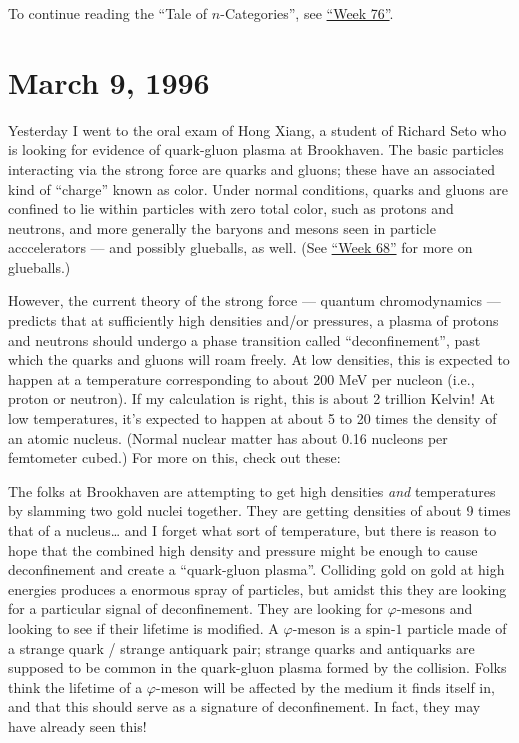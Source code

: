 \documentclass{article}
\renewcommand{\texttt}[1]{%
  \begingroup
  \ttfamily
  \begingroup\lccode`~=`/\lowercase{\endgroup\def~}{/\discretionary{}{}{}}%
  \begingroup\lccode`~=`[\lowercase{\endgroup\def~}{[\discretionary{}{}{}}%
  \begingroup\lccode`~=`.\lowercase{\endgroup\def~}{.\discretionary{}{}{}}%
  \catcode`/=\active\catcode`[=\active\catcode`.=\active
  \scantokens{#1\noexpand}%
  \endgroup
}
\begin{document}
To continue reading the ``Tale of \(n\)-Categories'', see
\protect\hyperlink{week76}{``Week 76''}.



\hypertarget{week76}{%
\section{March 9, 1996}\label{week76}}

Yesterday I went to the oral exam of Hong Xiang, a student of Richard
Seto who is looking for evidence of quark-gluon plasma at Brookhaven.
The basic particles interacting via the strong force are quarks and
gluons; these have an associated kind of ``charge'' known as color.
Under normal conditions, quarks and gluons are confined to lie within
particles with zero total color, such as protons and neutrons, and more
generally the baryons and mesons seen in particle acccelerators --- and
possibly glueballs, as well. (See \protect\hyperlink{week68}{``Week
68''} for more on glueballs.)

However, the current theory of the strong force --- quantum
chromodynamics --- predicts that at sufficiently high densities and/or
pressures, a plasma of protons and neutrons should undergo a phase
transition called ``deconfinement'', past which the quarks and gluons
will roam freely. At low densities, this is expected to happen at a
temperature corresponding to about 200 MeV per nucleon (i.e., proton or
neutron). If my calculation is right, this is about 2 trillion Kelvin!
At low temperatures, it's expected to happen at about 5 to 20 times the
density of an atomic nucleus. (Normal nuclear matter has about 0.16
nucleons per femtometer cubed.) For more on this, check out these:


The folks at Brookhaven are attempting to get high densities \emph{and}
temperatures by slamming two gold nuclei together. They are getting
densities of about 9 times that of a nucleus\ldots{} and I forget what
sort of temperature, but there is reason to hope that the combined high
density and pressure might be enough to cause deconfinement and create a
``quark-gluon plasma''. Colliding gold on gold at high energies produces
a enormous spray of particles, but amidst this they are looking for a
particular signal of deconfinement. They are looking for
\(\varphi\)-mesons and looking to see if their lifetime is modified. A
\(\varphi\)-meson is a spin-\(1\) particle made of a strange quark /
strange antiquark pair; strange quarks and antiquarks are supposed to be
common in the quark-gluon plasma formed by the collision. Folks think
the lifetime of a \(\varphi\)-meson will be affected by the medium it
finds itself in, and that this should serve as a signature of
deconfinement. In fact, they may have already seen this!
\end{document}
